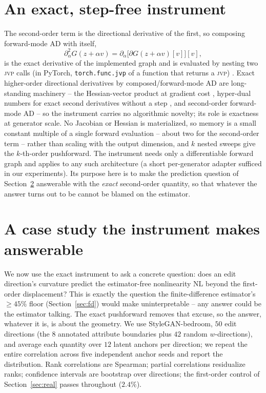 \documentclass[10pt]{article}
\newcommand{\jvp}{\textsc{jvp}}
\begin{document}
\section{An exact, step-free instrument}
\label{sec:inst}
The second-order term is the directional derivative of the first, so composing forward-mode AD with
itself,
\[
\partial^2_\alpha G(z+\alpha v)=\partial_\alpha\big[\partial G(z+\alpha v)[v]\big][v],
\]
is the exact derivative of the implemented graph and is evaluated by nesting two \jvp{} calls (in
PyTorch, \texttt{torch.func.jvp} of a function that returns a \jvp{}) \citep{paszke2019,griewank2008}.
Exact higher-order directional derivatives by composed/forward-mode AD are long-standing
machinery -- the Hessian-vector product at gradient cost \citep{pearlmutter1994}, hyper-dual
numbers for exact second derivatives without a step \citep{fike2011}, and second-order
forward-mode AD \citep{baydin2018,cobb2024} -- so the instrument carries no algorithmic
novelty; its role is exactness at generator scale.
No Jacobian or Hessian is materialized, so memory is a small constant multiple of a single forward
evaluation -- about two for the second-order term -- rather than scaling with the output dimension, and
$k$ nested sweeps give the $k$-th-order pushforward. The instrument needs only a differentiable forward
graph and applies to any such architecture (a short per-generator adapter sufficed in our experiments). Its purpose here is to make the
prediction question of Section~\ref{sec:negative} answerable with the \emph{exact} second-order quantity,
so that whatever the answer turns out to be cannot be blamed on the estimator.

\section{A case study the instrument makes answerable}
\label{sec:negative}
We now use the exact instrument to ask a concrete question: does an edit direction's curvature
predict the estimator-free nonlinearity $\mathrm{NL}$ beyond the first-order displacement? This is
exactly the question the finite-difference estimator's $\geq45\%$ floor (Section~\ref{sec:fd})
would make uninterpretable -- any answer could be the estimator talking. The exact pushforward
removes that excuse, so the answer, whatever it is, is about the geometry. We use StyleGAN-bedroom,
$50$ edit directions (the $8$ annotated attribute boundaries plus $42$ random $w$-directions), and
average each quantity over $12$ latent anchors per direction; we repeat the entire correlation
across five independent anchor seeds and report the distribution. Rank correlations are Spearman;
partial correlations residualize ranks; confidence intervals are bootstrap over directions; the
first-order control of Section~\ref{sec:real} passes throughout ($2.4\%$).
\end{document}
